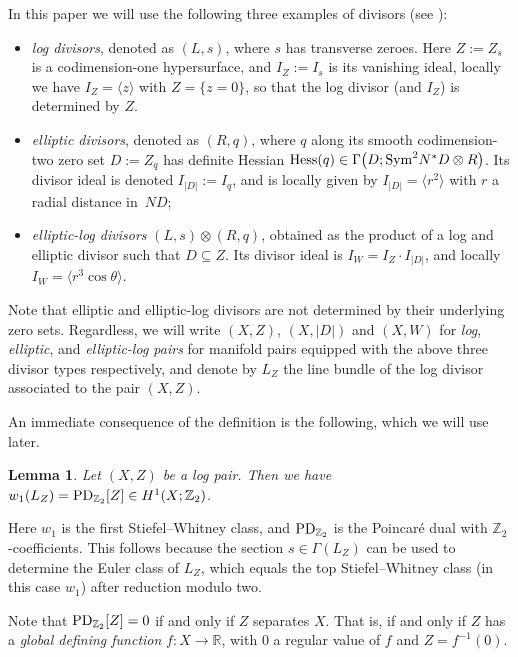 \documentclass[pdftex]{sigma}
\numberwithin{equation}{section}
\newtheorem{Lemma}[Theorem]{Lemma}
\begin{document}
In this paper we will use the following three examples of divisors (see \cite{CavalcantiGualtieri18,CavalcantiKlaasse18,Klaasse18}):
\begin{itemize}\itemsep=0pt
\item \emph{log divisors}, denoted as $(L,s)$, where $s$ has transverse zeroes. Here $Z := Z_s$ is a co\-di\-men\-sion-one hypersurface, and $I_Z := I_s$ is its vanishing ideal, locally we have $I_Z = \langle z \rangle$ with $Z = \{z = 0\}$, so that the log divisor (and $I_Z$) is determined by $Z$.
\item \emph{elliptic divisors}, denoted as $(R,q)$, where $q$ along its smooth codimension-two zero set $D := Z_q$ has definite Hessian ${\rm Hess}(q) \in \Gamma\big(D;{\rm Sym}^2 N^*D \otimes R\big)$. Its divisor ideal is denoted $I_{|D|} := I_q$, and is locally given by $I_{|D|} = \big\langle r^2 \big\rangle$ with $r$ a radial distance in~$ND$;
\item \emph{elliptic-log divisors} $(L,s) \otimes (R,q)$, obtained as the product of a log and elliptic divisor such that $D \subseteq Z$. Its divisor ideal is $I_W = I_Z \cdot I_{|D|}$, and locally $I_W = \big\langle r^3 \cos \theta \big\rangle$.
\end{itemize}
Note that elliptic and elliptic-log divisors are not determined by their underlying zero sets. Regardless, we will write $(X,Z)$, $(X,|D|)$ and $(X,W)$ for \emph{log}, \emph{elliptic}, and \emph{elliptic-log pairs} for manifold pairs equipped with the above three divisor types respectively, and denote by $L_Z$ the line bundle of the log divisor associated to the pair $(X,Z)$.

An immediate consequence of the definition is the following, which we will use later.

\begin{Lemma}\label{lem:logdivisor} Let $(X,Z)$ be a log pair. Then we have $w_1(L_Z) = {\rm PD}_{\mathbb{Z}_2}[Z] \in H^1(X;\mathbb{Z}_2)$.
\end{Lemma}

Here $w_1$ is the first Stiefel--Whitney class, and ${\rm PD}_{\mathbb{Z}_2}$ is the Poincar\'e dual with $\mathbb{Z}_2$-coefficients. This follows because the section $s \in \Gamma(L_Z)$ can be used to determine the Euler class of $L_Z$, which equals the top Stiefel--Whitney class (in this case $w_1$) after reduction modulo two.

\begin{Remark}\label{rem:separating} Note that ${\rm PD}_{\mathbb{Z}_2}[Z] = 0$ if and only if $Z$ separates $X$. That is, if and only if $Z$ has a \emph{global defining function} $f\colon X \to \mathbb{R}$, with $0$ a regular value of $f$ and $Z = f^{-1}(0)$.
\end{Remark}
\end{document}
